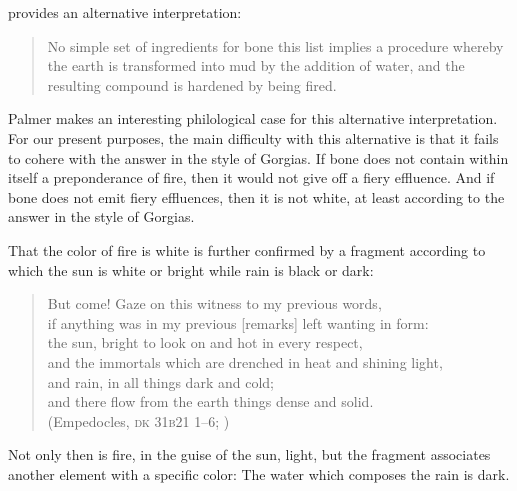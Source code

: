 \citet[301--302]{Palmer:2009qf} provides an alternative interpretation:
\begin{quote}
	No simple set of ingredients for bone this list implies a procedure whereby the earth is transformed into mud by the addition of water, and the resulting compound is hardened by being fired. \citep[302]{Palmer:2009qf}
\end{quote}
Palmer makes an interesting philological case for this alternative interpretation. For our present purposes, the main difficulty with this alternative is that it fails to cohere with the answer in the style of Gorgias. If bone does not contain within itself a preponderance of fire, then it would not give off a fiery effluence. And if bone does not emit fiery effluences, then it is not white, at least according to the answer in the style of Gorgias.

That the color of fire is white is further confirmed by a fragment according to which the sun is white or bright while rain is black or dark:
\begin{verse}
    But come! Gaze on this witness to my previous words,\\
    if anything was in my previous [remarks] left wanting in form:\\
    the sun, bright to look on and hot in every respect,\\
    and the immortals which are drenched in heat and shining light,\\
    and rain, in all things dark and cold;\\
    and there flow from the earth things dense and solid.\\
    (Empedocles, \textsc{dk} 31\textsc{b}21 1--6; \citealt[26 1--6, 229]{Inwood:2001ve})
\end{verse}
Not only then is fire, in the guise of the sun, light, but the fragment associates another element with a specific color: The water which composes the rain is dark.

